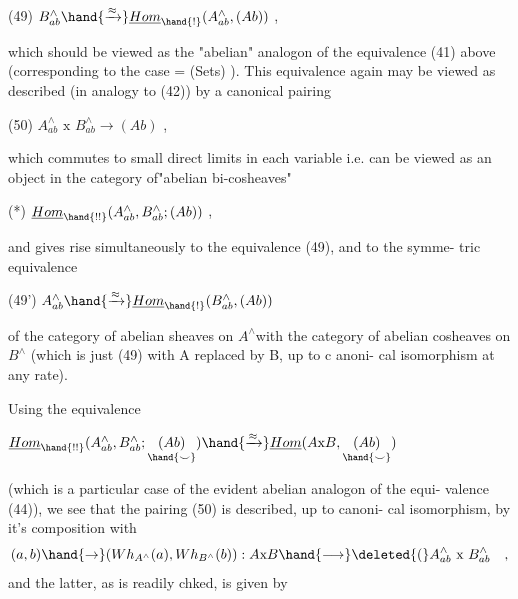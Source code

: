 
(49) \qquad $B^{\wedge}_{ab} \hand{\xrightarrow{\approx}} \underline{Hom}_{\hand{!}}(A^{\wedge}_{ab} , (Ab))$ ,

which should be viewed as the "abelian" analogon of the equivalence (41) 
above (corresponding to the case = (Sets) ). This equivalence again
may be viewed as described (in analogy to (42)) by a canonical pairing

(50) \qquad $A^{\wedge}_{ab} \text{ x } B^{\wedge}_{ab} \longrightarrow (Ab)$ ,

which commutes to small direct limits in each variable i.e. can be viewed
as an object in the category of"abelian bi-cosheaves"

(*) \qquad $\underline{Hom}_{\hand{!!}}(A^{\wedge}_{ab},B^{\wedge}_{ab}; (Ab))$ ,

and gives rise simultaneously to the equivalence (49), and to the symme-%
tric equivalence

(49') \qquad $A^{\wedge}_{ab} \hand{\xrightarrow{\approx}} \underline{Hom}_{\hand{!}}(B^{\wedge}_{ab}, (Ab) )$

of the category of abelian sheaves on $A^{\wedge}$\hand{/}with the category of abelian
cosheaves on $B^{\wedge}$ (which is just (49) with A replaced by B, up to c anoni-%
cal isomorphism at any rate).

Using the equivalence

 \qquad $\underline{Hom}_{\hand{!!}}(A^{\wedge}_{ab},B^{\wedge}_{ab} ; \underset{\hand{\smile}}{(Ab)}) \hand{\xrightarrow{\approx}} \underline{Hom}(A\text{x}B, \underset{\hand{\smile}}{(Ab)})$

(which is a particular case of the evident abelian analogon of the equi-%
valence (44)), we see that the pairing (50) is described, up to canoni-%
cal isomorphism, by it's  composition with
\[(a,b)\hand{\rightarrow}(Wh_{A^{\wedge}}(a), Wh_{B^{\wedge}}(b)) : A\text{x}B \hand{\longrightarrow} \deleted{(}A^{\wedge}_{ab} \text{ x } B^{\wedge}_{ab} \quad ,\]
and the latter, as is readily chked, is given by

